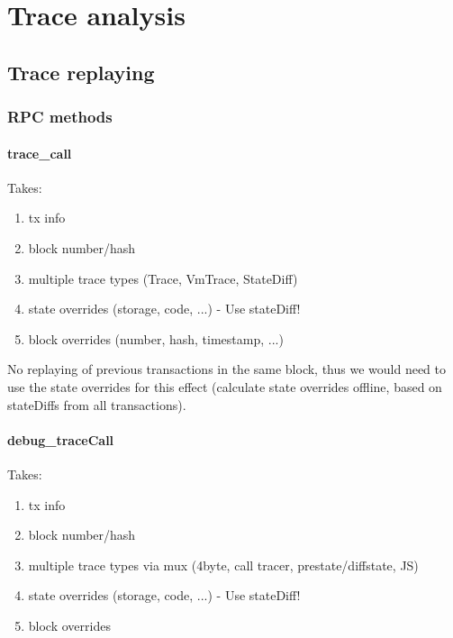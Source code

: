 \documentclass[draft,final]{vutinfth} %
\begin{document}
\chapter{Trace analysis}


\section{Trace replaying}

\subsection{RPC methods}



\subsubsection{trace\_call}


Takes:
\begin{enumerate}
    \item tx info
    \item block number/hash
    \item multiple trace types (Trace, VmTrace, StateDiff)
    \item state overrides (storage, code, ...) - Use stateDiff!
    \item block overrides (number, hash, timestamp, ...)
\end{enumerate}

No replaying of previous transactions in the same block, thus we would need to use the state overrides for this effect (calculate state overrides offline, based on stateDiffs from all transactions).

\subsubsection{debug\_traceCall}

Takes:
\begin{enumerate}
    \item tx info
    \item block number/hash
    \item multiple trace types via mux (4byte, call tracer, prestate/diffstate, JS)
    \item state overrides (storage, code, ...) - Use stateDiff!
    \item block overrides
\end{enumerate}
\end{document}
